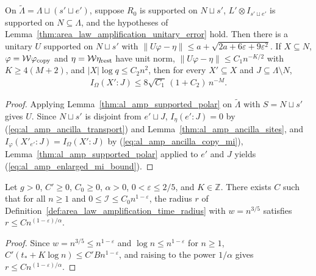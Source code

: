 \begin{lemma}
    \label{thm:al_amp_enlarged_steps}
    \leanok
    On $\widetilde\Lambda=\Lambda\sqcup(s'\sqcup e')$, suppose $R_0$ is
    supported on $N\sqcup s'$, $L'\otimes I_{s'\sqcup e'}$ is supported on
    $N\subseteq\Lambda$, and the hypotheses of
    Lemma~\ref{thm:area_law_amplification_unitary_error} hold. Then there is a
    unitary $U$ supported on $N\sqcup s'$ with
    $\|U\varphi-\eta\|\le a+\sqrt{2a+6\varepsilon+9\varepsilon^2}$. If
    $X\subseteq N$, $\varphi=\mathcal W\varphi_{\rm copy}$ and
    $\eta=\mathcal W\eta_{\rm rest}$ have unit norm,
    $\|U\varphi-\eta\|\le C_1n^{-K/2}$ with $K\ge4(M+2)$, and
    $|X|\log q\le C_2n^2$, then for every $X'\subseteq X$ and
    $J\subseteq\Lambda\setminus N$,
    \begin{align}
        I_\Omega(X':J)\le 8\sqrt{C_1}\,(1+C_2)\,n^{-M}.
        \label{eq:al_amp_enlarged_mi_bound}
    \end{align}
\end{lemma}
\begin{proof}
    \leanok
    Applying Lemma~\ref{thm:al_amp_supported_polar} on $\widetilde\Lambda$
    with $S=N\sqcup s'$ gives $U$. Since $N\sqcup s'$ is disjoint from
    $e'\sqcup J$, $I_\eta(e':J)=0$ by (\ref{eq:al_amp_ancilla_transport}) and
    Lemma~\ref{thm:al_amp_ancilla_sites}, and $I_\varphi(X'_{e'}:J)=I_\Omega(X':J)$
    by (\ref{eq:al_amp_ancilla_copy_mi}), Lemma~\ref{thm:al_amp_supported_polar}
    applied to $e'$ and $J$ yields (\ref{eq:al_amp_enlarged_mi_bound}).
\end{proof}

\begin{lemma}
    \label{thm:al_amp_radius_bound}
    \leanok
    Let $g>0$, $C'\ge0$, $C_0\ge0$, $\alpha>0$, $0<\varepsilon\le2/5$, and
    $K\in\mathbb Z$. There exists $C$ such that for all $n\ge1$ and
    $0\le\mathcal I\le C_0n^{1-\varepsilon}$, the radius $r$ of
    Definition~\ref{def:area_law_amplification_time_radius} with $w=n^{3/5}$
    satisfies $r\le Cn^{(1-\varepsilon)/\alpha}$.
\end{lemma}
\begin{proof}
    \leanok
    Since $w=n^{3/5}\le n^{1-\varepsilon}$ and $\log n\le n^{1-\varepsilon}$ for
    $n\ge1$, $C'(t_*+K\log n)\le C'Bn^{1-\varepsilon}$, and raising to the
    power $1/\alpha$ gives $r\le Cn^{(1-\varepsilon)/\alpha}$.
\end{proof}

